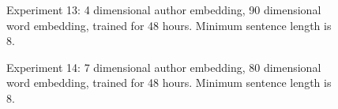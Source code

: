 \documentclass{article}%
\begin{document}
\begin{figure}
\noindent{}
\caption{Experiment 13: 4 dimensional author embedding, 90 dimensional word embedding, trained for 48 hours. Minimum sentence length is 8.}
\end{figure}
\begin{figure}
\noindent{}
\caption{Experiment 14: 7 dimensional author embedding, 80 dimensional word embedding, trained for 48 hours. Minimum sentence length is 8.}
\end{figure}
\end{document}
